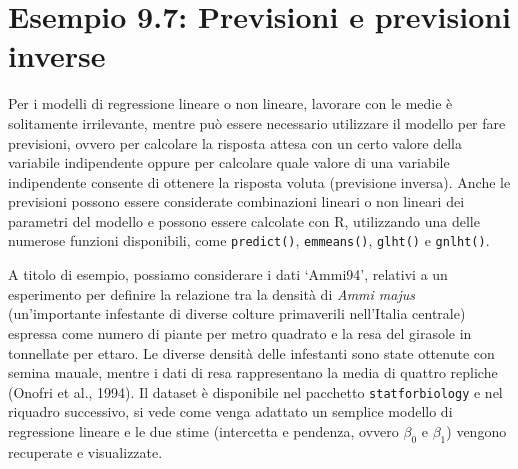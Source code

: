 \documentclass[
  12pt,
]{book}
\newenvironment{Shaded}{\begin{snugshade}}{\end{snugshade}}
\newcommand{\AttributeTok}[1]{\textcolor[rgb]{0.77,0.63,0.00}{#1}}
\newcommand{\DocumentationTok}[1]{\textcolor[rgb]{0.56,0.35,0.01}{\textbf{\textit{#1}}}}
\newcommand{\FloatTok}[1]{\textcolor[rgb]{0.00,0.00,0.81}{#1}}
\newcommand{\FunctionTok}[1]{\textcolor[rgb]{0.00,0.00,0.00}{#1}}
\newcommand{\NormalTok}[1]{#1}
\newcommand{\OtherTok}[1]{\textcolor[rgb]{0.56,0.35,0.01}{#1}}
\newcommand{\SpecialCharTok}[1]{\textcolor[rgb]{0.00,0.00,0.00}{#1}}
\newcommand{\StringTok}[1]{\textcolor[rgb]{0.31,0.60,0.02}{#1}}
\begin{document}
\begin{Shaded}
\end{Shaded}

\hypertarget{esempio-9.7-previsioni-e-previsioni-inverse}{%
\section{Esempio 9.7: Previsioni e previsioni inverse}\label{esempio-9.7-previsioni-e-previsioni-inverse}}

Per i modelli di regressione lineare o non lineare, lavorare con le medie è solitamente irrilevante, mentre può essere necessario utilizzare il modello per fare previsioni, ovvero per calcolare la risposta attesa con un certo valore della variabile indipendente oppure per calcolare quale valore di una variabile indipendente consente di ottenere la risposta voluta (previsione inversa). Anche le previsioni possono essere considerate combinazioni lineari o non lineari dei parametri del modello e possono essere calcolate con R, utilizzando una delle numerose funzioni disponibili, come \texttt{predict()}, \texttt{emmeans()}, \texttt{glht()} e \texttt{gnlht()}.

A titolo di esempio, possiamo considerare i dati `Ammi94', relativi a un esperimento per definire la relazione tra la densità di \emph{Ammi majus} (un'importante infestante di diverse colture primaverili nell'Italia centrale) espressa come numero di piante per metro quadrato e la resa del girasole in tonnellate per ettaro. Le diverse densità delle infestanti sono state ottenute con semina mauale, mentre i dati di resa rappresentano la media di quattro repliche (Onofri et al., 1994). Il dataset è disponibile nel pacchetto \texttt{statforbiology} e nel riquadro successivo, si vede come venga adattato un semplice modello di regressione lineare e le due stime (intercetta e pendenza, ovvero \(\beta_0\) e \(\beta_1\)) vengono recuperate e visualizzate.
\end{document}
